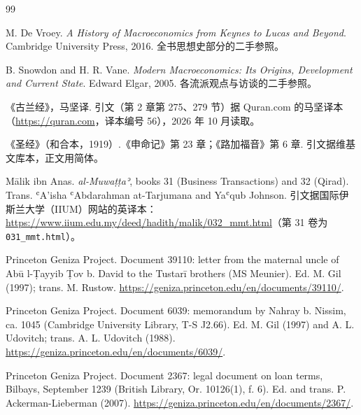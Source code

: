 \begin{thebibliography}{99}
\small\raggedright\setlength{\itemsep}{5pt}\setlength{\parskip}{0pt}

 M. De Vroey. \emph{A History of Macroeconomics from Keynes to Lucas and Beyond}. Cambridge University Press, 2016. 全书思想史部分的二手参照。

 B. Snowdon and H. R. Vane. \emph{Modern Macroeconomics: Its Origins, Development and Current State}. Edward Elgar, 2005. 各流派观点与访谈的二手参照。

 《古兰经》，马坚译. 引文（第 2 章第 275、279 节）据 Quran.com 的马坚译本（\url{https://quran.com}，译本编号 56），2026 年 10 月读取。

 《圣经》（和合本，1919）.《申命记》第 23 章；《路加福音》第 6 章. 引文据维基文库本，正文用简体。

 Mālik ibn Anas. \emph{al-Muwaṭṭaʾ}, books 31 (Business Transactions) and 32 (Qirad). Trans. ʿA'isha ʿAbdarahman at-Tarjumana and Yaʿqub Johnson. 引文据国际伊斯兰大学（IIUM）网站的英译本：\url{https://www.iium.edu.my/deed/hadith/malik/032_mmt.html}（第 31 卷为 \texttt{031\_mmt.html}）。

 Princeton Geniza Project. Document 39110: letter from the maternal uncle of Abū l-Ṭayyib Ṭov b. David to the Tustarī brothers (MS Meunier). Ed. M. Gil (1997); trans. M. Rustow. \url{https://geniza.princeton.edu/en/documents/39110/}.

 Princeton Geniza Project. Document 6039: memorandum by Nahray b. Nissim, ca. 1045 (Cambridge University Library, T-S J2.66). Ed. M. Gil (1997) and A. L. Udovitch; trans. A. L. Udovitch (1988). \url{https://geniza.princeton.edu/en/documents/6039/}.

 Princeton Geniza Project. Document 2367: legal document on loan terms, Bilbays, September 1239 (British Library, Or. 10126(1), f. 6). Ed. and trans. P. Ackerman-Lieberman (2007). \url{https://geniza.princeton.edu/en/documents/2367/}.


\end{thebibliography}
